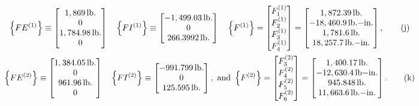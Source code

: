 \documentclass{AeroStructure-ERJohnson}
\begin{document}
\begin{example}
\begin{gather}
\left\{F E^{(1)}\right\} \equiv\left[\begin{array}{@{}c@{}}1,869\,\mathrm{lb}. \\0 \\1,784.98\,\mathrm{lb}. \\0\end{array}\right] \quad\left\{F I^{(1)}\right\} \equiv\left[\begin{array}{@{}c@{}}-1,499.03\,\mathrm{lb}. \\0 \\266.3992\,\mathrm{lb}.\end{array}\right] \quad\left\{F^{(1)}\right\}=\left[\begin{array}{@{}c@{}}F_{1}^{(1)} \\F_{2}^{(1)} \\F_{3}^{(1)} \\F_{4}^{(1)}\end{array}\right]=\left[\begin{array}{@{}c@{}}1,872.39\,\mathrm{lb}. \\-18,460.9\,\mathrm{lb}.\mathrm{-in}. \\1,781.6\,\mathrm{lb}. \\18,257.7\,\mathrm{lb}.\mathrm{-in}.\end{array}\right], \label{eq17.5.j}\tag{j} \\
\left\{F E^{(2)}\right\} \equiv\left[\begin{array}{@{}c@{}}1,384.05\,\mathrm{lb}. \\0 \\961.96\,\mathrm{lb}. \\0\end{array}\right] \quad\left\{F I^{(2)}\right\} \equiv\left[\begin{array}{@{}c@{}}-991.799\,\mathrm{lb}. \\0 \\125.595\,\mathrm{lb}.\end{array}\right], \textrm{ and } \left\{F^{(2)}\right\}=\left[\begin{array}{@{}c@{}}F_{3}^{(2)} \\F_{4}^{(2)} \\F_{5}^{(2)} \\F_{6}^{(2)}\end{array}\right]=\left[\begin{array}{@{}c@{}}1,400.17\,\mathrm{lb}. \\-12,630.4\,\mathrm{lb}\mathrm{-in}. \\945.848\,\mathrm{lb}. \\11,663.6\,\mathrm{lb}.\mathrm{-in}.\end{array}\right]. \label{eq17.5.k}\tag{k}

\end{gather}
\end{example}
\end{document}
